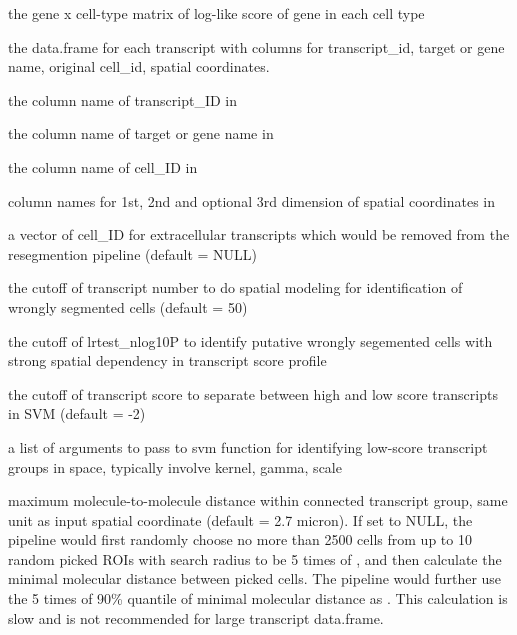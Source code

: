 \documentclass[letterpaper]{book}
\begin{document}
\begin{Arguments}
\begin{ldescription}
\item[\code{score\_GeneMatrix}] the gene x cell-type matrix of log-like score of gene in each cell type

\item[\code{transcript\_df}] the data.frame for each transcript with columns for transcript\_id, target or gene name, original cell\_id, spatial coordinates.

\item[\code{transID\_coln}] the column name of transcript\_ID in 

\item[\code{transGene\_coln}] the column name of target or gene name in 

\item[\code{cellID\_coln}] the column name of cell\_ID in 

\item[\code{spatLocs\_colns}] column names for 1st, 2nd and optional 3rd dimension of spatial coordinates in 

\item[\code{extracellular\_cellID}] a vector of cell\_ID for extracellular transcripts which would be removed from the resegmention pipeline (default = NULL)

\item[\code{flagModel\_TransNum\_cutoff}] the cutoff of transcript number to do spatial modeling for identification of wrongly segmented cells (default = 50)

\item[\code{flagCell\_lrtest\_cutoff}] the cutoff of lrtest\_nlog10P to identify putative wrongly segemented cells with strong spatial dependency in transcript score profile

\item[\code{svmClass\_score\_cutoff}] the cutoff of transcript score to separate between high and low score transcripts in SVM (default = -2)

\item[\code{svm\_args}] a list of arguments to pass to svm function for identifying low-score transcript groups in space, typically involve kernel, gamma, scale

\item[\code{molecular\_distance\_cutoff}] maximum molecule-to-molecule distance within connected transcript group, same unit as input spatial coordinate (default = 2.7 micron).
If set to NULL, the pipeline would first randomly choose no more than 2500 cells from up to 10 random picked ROIs with search radius to be 5 times of , and then calculate the minimal molecular distance between picked cells. The pipeline would further use the 5 times of 90\% quantile of minimal molecular distance as . This calculation is slow and is not recommended for large transcript data.frame.


\end{ldescription}
\end{Arguments}
\end{document}
